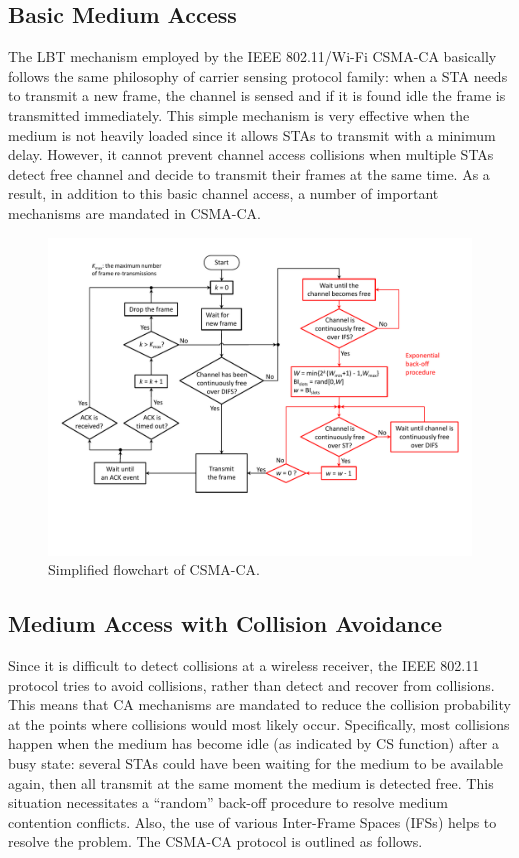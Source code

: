 \subsection{Basic Medium Access}
\label{basic-medium-access}
The LBT mechanism employed by the IEEE 802.11/Wi-Fi CSMA-CA basically follows the same philosophy of carrier sensing protocol family: when a STA needs to transmit a new frame, the channel is sensed and if it is found idle the frame is transmitted immediately. This simple mechanism is very effective when the medium is not heavily loaded since it allows STAs to transmit with a minimum delay. However, it cannot prevent channel access collisions when multiple STAs detect free channel and decide to transmit their frames at the same time. As a result, in addition to this basic channel access, a number of important mechanisms are mandated in CSMA-CA.
\begin{figure}[!t]
	\centering
	\includegraphics[width=1.0\columnwidth]{figures2/CSMA-CA-flowchart}
	\caption{Simplified flowchart of CSMA-CA.}
	\label{figs:CSMA-CA-flowchart}
\end{figure}

\subsection{Medium Access with Collision Avoidance}
\label{collision-avoidance}
Since it is difficult to detect collisions at a wireless receiver, the IEEE 802.11 protocol tries to avoid collisions, rather than detect and recover from collisions. This means that CA mechanisms are mandated to reduce the collision probability at the points where collisions would most likely occur. Specifically, most collisions happen when the medium has become idle (as indicated by CS function) after a busy state: several STAs could have been waiting for the medium to be available again, then all transmit at the same moment the medium is detected free. This situation necessitates a ``random'' back-off procedure to resolve medium contention conflicts. Also, the use of various Inter-Frame Spaces (IFSs) helps to resolve the problem. The CSMA-CA protocol is outlined as follows.

